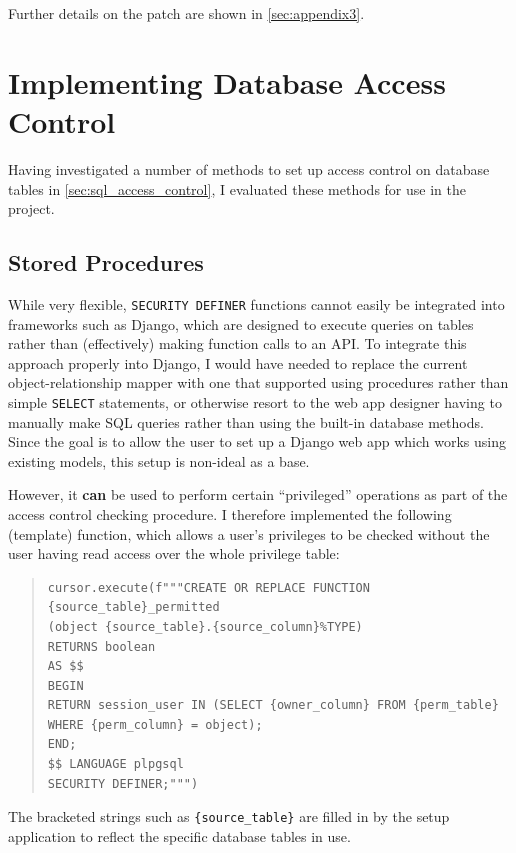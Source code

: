 \documentclass[12pt]{report}
\begin{document}
Further details on the patch are shown in \autoref{sec:appendix3}.

\section{Implementing Database Access Control}
\label{sec:implementing_database_access_control}
Having investigated a number of methods to set up access control on database tables in \autoref{sec:sql_access_control}, I evaluated these methods for use in the project.

\subsection{Stored Procedures}
While very flexible, \texttt{SECURITY DEFINER} functions cannot easily be integrated into frameworks such as Django, which are designed to execute queries on tables rather than (effectively) making function calls to an API. To integrate this approach properly into Django, I would have needed to replace the current object-relationship mapper with one that supported using procedures rather than simple \texttt{SELECT} statements, or otherwise resort to the web app designer having to manually make SQL queries rather than using the built-in database methods. Since the goal is to allow the user to set up a Django web app which works using existing models, this setup is non-ideal as a base.

However, it \textbf{can} be used to perform certain ``privileged'' operations as part of the access control checking procedure. I therefore implemented the following (template) function, which allows a user's privileges to be checked without the user having read access over the whole privilege table:

\begin{quote}
\begin{verbatim}
cursor.execute(f"""CREATE OR REPLACE FUNCTION {source_table}_permitted
(object {source_table}.{source_column}%TYPE)
RETURNS boolean
AS $$
BEGIN
RETURN session_user IN (SELECT {owner_column} FROM {perm_table}
WHERE {perm_column} = object);
END;
$$ LANGUAGE plpgsql
SECURITY DEFINER;""")
\end{verbatim}
\end{quote}

The bracketed strings such as \verb+{source_table}+ are filled in by the setup application to reflect the specific database tables in use.
\end{document}
